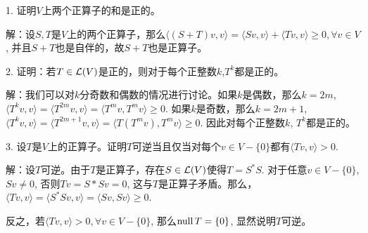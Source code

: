 \documentclass[hyperref,]{ctexart}
\begin{document}
\noindent{} 1. 证明\(V\)上两个正算子的和是正的。

\smallskip

\noindent{}
解：设\(S,T\)是\(V\)上的两个正算子，那么\(\langle (S+T)v,v\rangle = \langle Sv,v\rangle+\langle Tv,v\rangle\ge 0,\forall v\in V\),
并且\(S+T\)也是自伴的，故\(S+T\)也是正算子。

\bigskip

\noindent{} 2.
证明：若\(T\in\mathcal{L}(V)\)是正的，则对于每个正整数\(k\),\(T^k\)都是正的。

\smallskip

\noindent{}
解：我们可以对\(k\)分奇数和偶数的情况进行讨论。如果\(k\)是偶数，那么\(k=2m\),\(\langle T^kv,v\rangle = \langle T^{2m}v,v\rangle =\langle T^mv,T^mv\rangle\ge 0\).
如果\(k\)是奇数，那么\(k=2m+1\),
\(\langle T^kv,v\rangle=\langle T^{2m+1}v,v\rangle = \langle T(T^mv),T^mv\rangle\ge 0\).
因此对每个正整数\(k\), \(T^k\)都是正的。

\bigskip

\noindent{} 3.
设\(T\)是\(V\)上的正算子。证明\(T\)可逆当且仅当对每个\(v\in V-\{0\}\)都有\(\langle Tv,v\rangle>0\).

\smallskip

\noindent{}
解：设\(T\)可逆。由于\(T\)是正算子，存在\(S\in\mathcal{L}(V)\)使得\(T=S^*S\).
对于任意\(v\in V-\{0\}\), \(Sv\ne 0\), 否则\(Tv= S*Sv=0\),
这与\(T\)是正算子矛盾。那么，\(\langle Tv,v\rangle = \langle S^*Sv,v\rangle=\langle Sv,Sv\rangle\ge 0\).

反之，若\(\langle Tv,v\rangle>0,\forall v\in V-\{0\}\),
那么\(\mathrm{null}\, T=\{0\}\), 显然说明\(T\)可逆。
\end{document}
